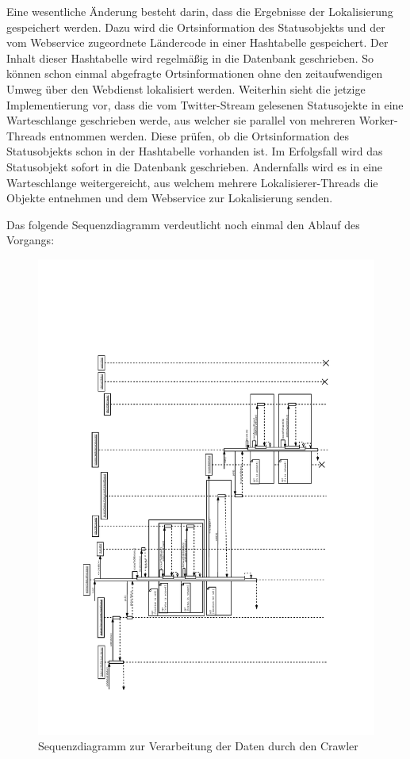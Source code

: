 Eine wesentliche Änderung besteht darin, dass die Ergebnisse der Lokalisierung gespeichert werden. Dazu wird die Ortsinformation des Statusobjekts und der vom Webservice zugeordnete Ländercode in einer Hashtabelle gespeichert. Der Inhalt dieser Hashtabelle wird regelmäßig in die Datenbank geschrieben. So können schon einmal abgefragte Ortsinformationen ohne den zeitaufwendigen Umweg über den Webdienst lokalisiert werden. 
Weiterhin sieht die jetzige Implementierung vor, dass die vom Twitter-Stream gelesenen Statusojekte in eine Warteschlange geschrieben werde, aus welcher sie parallel von mehreren Worker-Threads entnommen werden. Diese prüfen, ob die Ortsinformation des Statusobjekts schon in der Hashtabelle vorhanden ist. Im Erfolgsfall wird das Statusobjekt sofort in die Datenbank geschrieben. Andernfalls wird es in eine  Warteschlange weitergereicht, aus welchem mehrere Lokalisierer-Threads die Objekte entnehmen und dem Webservice zur Lokalisierung senden.

Das folgende Sequenzdiagramm verdeutlicht noch einmal den Ablauf des Vorgangs:
\begin{figure}[H]
	\centering
	\includegraphics[width=\textwidth,height=\textheight,keepaspectratio=true]{dia/crawler_process_sequence}
	\caption{Sequenzdiagramm zur Verarbeitung der Daten durch den Crawler}
	\label{fig:Crawler}
\end{figure}

